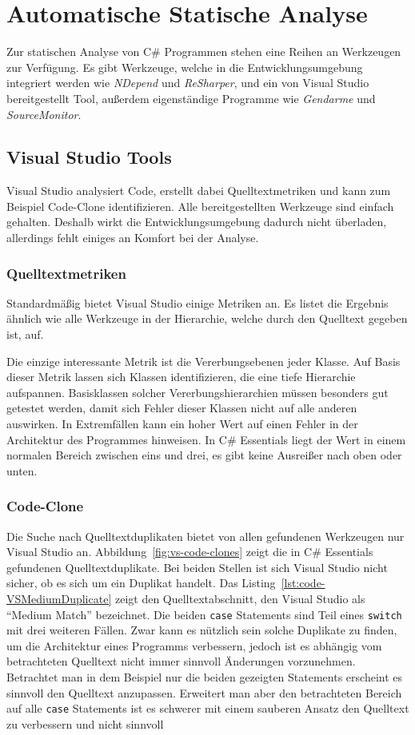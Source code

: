 %
\section{Automatische Statische Analyse}
Zur statischen Analyse von C\# Programmen stehen eine Reihen an Werkzeugen zur Verfügung. Es gibt Werkzeuge, welche in die Entwicklungsumgebung integriert werden wie \emph{NDepend} und \emph{ReSharper}, und ein von Visual Studio bereitgestellt Tool, außerdem eigenständige Programme wie \emph{Gendarme} und \emph{SourceMonitor}.

\subsection{Visual Studio Tools}
Visual Studio analysiert Code, erstellt dabei Quelltextmetriken und kann zum Beispiel Code-Clone identifizieren. Alle bereitgestellten Werkzeuge sind einfach gehalten. Deshalb wirkt die Entwicklungsumgebung dadurch nicht überladen, allerdings fehlt einiges an Komfort bei der Analyse.

\subsubsection{Quelltextmetriken}
Standardmäßig bietet Visual Studio einige Metriken an. Es listet die Ergebnis ähnlich wie alle Werkzeuge in der Hierarchie, welche durch den Quelltext gegeben ist, auf.

Die einzige interessante Metrik ist die Vererbungsebenen jeder Klasse. Auf Basis dieser Metrik lassen sich Klassen identifizieren, die eine tiefe Hierarchie aufspannen. Basisklassen solcher Vererbungshierarchien müssen besonders gut getestet werden, damit sich Fehler dieser Klassen nicht auf alle anderen auswirken. In Extremfällen kann ein hoher Wert auf einen Fehler in der Architektur des Programmes hinweisen. In C\# Essentials liegt der Wert in einem normalen Bereich zwischen eins und drei, es gibt keine Ausreißer nach oben oder unten.

\subsubsection{Code-Clone}
Die Suche nach Quelltextduplikaten bietet von allen gefundenen Werkzeugen nur Visual Studio an. Abbildung~\ref{fig:vs-code-clones} zeigt die in C\# Essentials gefundenen Quelltextduplikate. Bei beiden Stellen ist sich Visual Studio nicht sicher, ob es sich um ein Duplikat handelt. Das Listing~\ref{lst:code-VSMediumDuplicate} zeigt den Quelltextabschnitt, den Visual Studio als \enquote{Medium Match} bezeichnet. Die beiden \texttt{case} Statements sind Teil eines \texttt{switch} mit drei weiteren Fällen. Zwar kann es nützlich sein solche Duplikate zu finden, um die Architektur eines Programms verbessern, jedoch ist es abhängig vom betrachteten Quelltext nicht immer sinnvoll Änderungen vorzunehmen. Betrachtet man in dem Beispiel nur die beiden gezeigten Statements erscheint es sinnvoll den Quelltext anzupassen. Erweitert man aber den betrachteten Bereich auf alle \texttt{case} Statements ist es schwerer mit einem sauberen Ansatz den Quelltext zu verbessern und nicht sinnvoll

